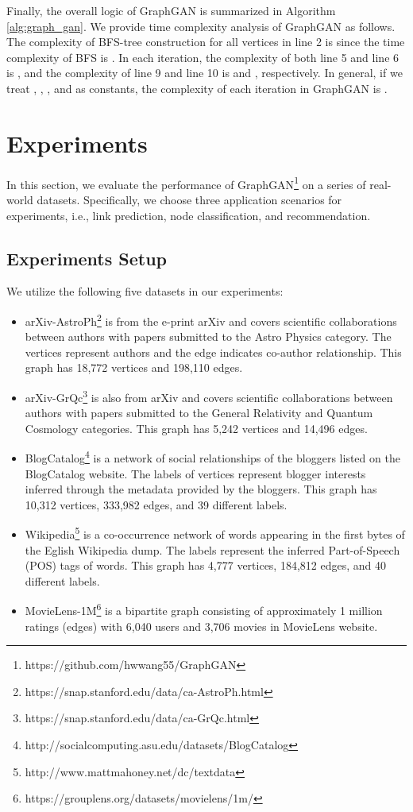\documentclass[letterpaper]{article}
\begin{document}
	
		Finally, the overall logic of GraphGAN is summarized in Algorithm \ref{alg:graph_gan}.
		We provide time complexity analysis of GraphGAN as follows.
		The complexity of BFS-tree construction for all vertices in line 2 is  since the time complexity of BFS is  \cite{cormen2009introduction}.
		In each iteration, the complexity of both line 5 and line 6 is , and the complexity of line 9 and line 10 is  and , respectively.
		In general, if we treat , , , and  as constants, the complexity of each iteration in GraphGAN is .
			
			
			
\section{Experiments}
	In this section, we evaluate the performance of GraphGAN\footnote{https://github.com/hwwang55/GraphGAN} on a series of real-world datasets.
	Specifically, we choose three application scenarios for experiments, i.e., link prediction, node classification, and recommendation.

	\subsection{Experiments Setup}
		We utilize the following five datasets in our experiments:
		\begin{itemize}
		 	\setlength\itemsep{0.0em}
			\item
				arXiv-AstroPh\footnote{https://snap.stanford.edu/data/ca-AstroPh.html} is from the e-print arXiv and covers scientific collaborations between authors with papers submitted to the Astro Physics category.
				The vertices represent authors and the edge indicates co-author relationship.
				This graph has 18,772 vertices and 198,110 edges.
			\item
				arXiv-GrQc\footnote{https://snap.stanford.edu/data/ca-GrQc.html} is also from arXiv and covers scientific collaborations between authors with papers submitted to the General Relativity and Quantum Cosmology categories.
				This graph has 5,242 vertices and 14,496 edges.
			\item
				BlogCatalog\footnote{http://socialcomputing.asu.edu/datasets/BlogCatalog} is a network of social relationships of the bloggers listed on the BlogCatalog website.
				The labels of vertices represent blogger interests inferred through the metadata provided by the bloggers.
				This graph has 10,312 vertices, 333,982 edges, and 39 different labels.
			\item
				Wikipedia\footnote{http://www.mattmahoney.net/dc/textdata} is a co-occurrence network of words appearing in the first  bytes of the Eglish Wikipedia dump.
				The labels represent the inferred Part-of-Speech (POS) tags of words.
				This graph has 4,777 vertices, 184,812 edges, and 40 different labels.
			\item
				MovieLens-1M\footnote{https://grouplens.org/datasets/movielens/1m/} is a bipartite graph consisting of approximately 1 million ratings (edges) with 6,040 users and 3,706 movies in MovieLens website.
		\end{itemize}
		
\end{document}
